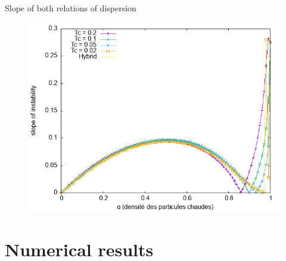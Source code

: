 \documentclass{beamer}
\begin{document}
\begin{frame}{Slope of both relations of dispersion}
  \begin{figure}\centering
    \includegraphics[height=0.8\textheight]{img/limit_slope_alpha.png}
  \end{figure}
\end{frame}

\section{Numerical results}
\end{document}
